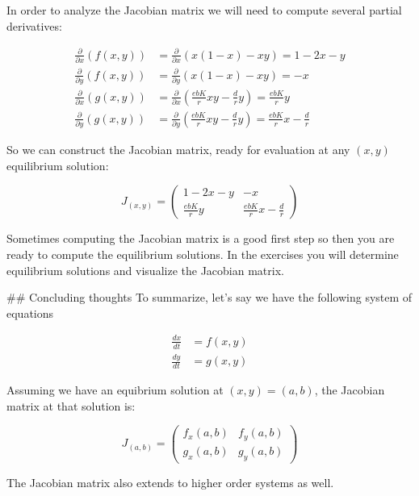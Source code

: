 \documentclass[
]{book}
\theoremstyle{definition}
\theoremstyle{definition}
\theoremstyle{definition}
\theoremstyle{remark}
\begin{document}
In order to analyze the Jacobian matrix we will need to compute several partial derivatives:

\begin{align}
\frac{\partial}{\partial x} \left( f(x,y) \right) &= \frac{\partial}{\partial x} \left( x(1-x) - xy \right) = 1-2x-y \\
\frac{\partial}{\partial y} \left( f(x,y) \right) &= \frac{\partial}{\partial y} \left( x(1-x) - xy \right) = -x \\
\frac{\partial}{\partial x} \left( g(x,y) \right) &= \frac{\partial}{\partial x} \left( \frac{ebK}{r}xy -\frac{d}{r}y \right) = \frac{ebK}{r}y  \\
\frac{\partial}{\partial y} \left( g(x,y) \right) &= \frac{\partial}{\partial y} \left( \frac{ebK}{r}xy -\frac{d}{r}y \right) = \frac{ebK}{r}x -\frac{d}{r}
\end{align}

So we can construct the Jacobian matrix, ready for evaluation at any $(x,y)$ equilibrium solution:

\begin{equation}
J_{(x,y)} = \begin{pmatrix} 1-2x-y & -x \\ \frac{ebK}{r}y & \frac{ebK}{r}x -\frac{d}{r} \end{pmatrix}
\end{equation}

Sometimes computing the Jacobian matrix is a good first step so then you are ready to compute the equilibrium solutions.  In the exercises you will determine equilibrium solutions and visualize the Jacobian matrix.

## Concluding thoughts
To summarize, let's say we have the following system of equations

\begin{align}
\frac{dx}{dt} &= f(x,y) \\
\frac{dy}{dt} &= g(x,y)
\end{align}

Assuming we have an equibrium solution at $(x,y)=(a,b)$, the Jacobian matrix at that solution is:

\begin{equation}
J_{(a,b)} =\begin{pmatrix} f_{x}(a,b) & f_{y}(a,b) \\ g_{x}(a,b) &  g_{y}(a,b) \end{pmatrix}
\end{equation}

The Jacobian matrix also extends to higher order systems as well.
\end{document}
